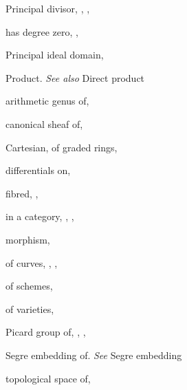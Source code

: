 {{\noindent\hspace*{0.0bp}Principal divisor, , , \par
\noindent\hspace*{7.5bp}has degree zero, , \par
\noindent\hspace*{0.0bp}Principal ideal domain, \par
\noindent\hspace*{0.0bp}Product. \emph{See also} Direct product\par
\noindent\hspace*{7.5bp}arithmetic genus of, \par
\noindent\hspace*{7.5bp}canonical sheaf of, \par
\noindent\hspace*{7.5bp}Cartesian, of graded rings, \par
\noindent\hspace*{7.5bp}differentials on, \par
\noindent\hspace*{7.5bp}fibred, , \par
\noindent\hspace*{7.5bp}in a category, , , \par
\noindent\hspace*{7.5bp}morphism, \par
\noindent\hspace*{7.5bp}of curves, , , \par
\noindent\hspace*{7.5bp}of schemes, \par
\noindent\hspace*{7.5bp}of varieties, \par
\noindent\hspace*{7.5bp}Picard group of, , , \par
\noindent\hspace*{7.5bp}Segre embedding of. \emph{See} Segre embedding\par
\noindent\hspace*{7.5bp}topological space of, \par
}}

